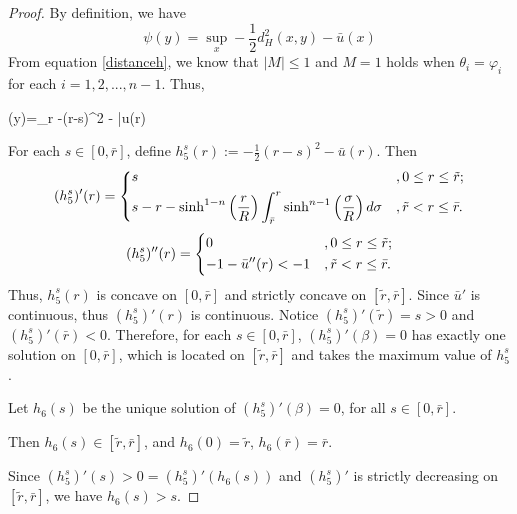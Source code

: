 \begin{proof}
	By definition, we have
	\begin{equation*}
	\psi(y)=\sup\limits_{x} -\frac{1}{2}d_H^2(x,y) - \bar{u}(x)
	\end{equation*}
	From equation \eqref{distanceh}, we know that $|M|\le 1$ and $M=1$ holds when  $\theta_i= \varphi_i$ for each $i = 1,2,..., n-1$. Thus,
	\begin{flalign*}
	\psi(y)=\sup\limits_{r} -(r-s)^2 - \bar{u}(r)
	\end{flalign*}
	
	For each $s\in [0,\bar{r}]$, define $h_5^s(r):= -\frac{1}{2}(r-s)^2 - \bar{u}(r)$. Then 
	\begin{equation*}
	(h_5^s)'(r) =
	\begin{dcases}
	s & ,0\le r\le \tilde{r}; \\
	s-r-\sinh^{1-n}\left(\frac{r}{R}\right)\int_{\bar{r}}^r\sinh^{n-1}\left(\frac{\sigma}{R}\right)d\sigma    & ,\tilde{r} < r \le \bar{r}. \\
	\end{dcases}
	\end{equation*}
	\begin{equation*}
	(h_5^s)''(r)= 
	\begin{dcases}
	0 & ,0\le r\le \tilde{r}; \\
	-1-\bar{u}''(r)<-1    & ,\tilde{r} < r \le \bar{r}. \\
	\end{dcases}
	\end{equation*}
	Thus, $h_5^s(r)$ is concave on $[0,\bar{r}]$ and strictly concave on $[\tilde{r}, \bar{r}]$. Since $\bar{u}'$ is continuous, thus $(h_5^s)'(r)$ is continuous. Notice $(h_5^s)'(\tilde{r})=s>0$ and $(h_5^s)'(\bar{r})<0$. Therefore, for each $s\in [0,\bar{r}]$, $(h_5^s)'(\beta) =0$ has exactly one solution on $[0, \bar{r}]$, which is located on $[\tilde{r}, \bar{r}]$ and takes the maximum value of $h_5^s$.
	
	Let $h_6(s)$ be the unique solution of $(h_5^s)'(\beta) =0$, for all $s\in [0,\bar{r}]$.
	
	Then $h_6(s)\in [\tilde{r}, \bar{r}]$, and $h_6(0) = \tilde{r}$, $h_6(\bar{r})= \bar{r}$. 
	
	Since $(h_5^s)'(s)>0 = (h_5^s)'(h_6(s))$ and $(h_5^s)'$ is strictly decreasing on $[\tilde{r}, \bar{r}]$, we have $h_6(s)>s$.
	

\end{proof}
